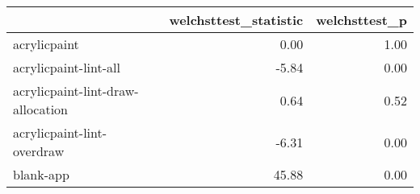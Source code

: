 \begin{tabular}{lrr}
\toprule
{} &  welchsttest\_statistic &  welchsttest\_p \\
\midrule
acrylicpaint                      &                   0.00 &           1.00 \\
acrylicpaint-lint-all             &                  -5.84 &           0.00 \\
acrylicpaint-lint-draw-allocation &                   0.64 &           0.52 \\
acrylicpaint-lint-overdraw        &                  -6.31 &           0.00 \\
blank-app                         &                  45.88 &           0.00 \\
\bottomrule
\end{tabular}
